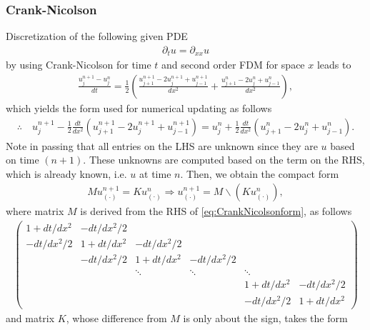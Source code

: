 \documentclass[12pt]{article}
\begin{document}
\subsubsection{Crank-Nicolson}
Discretization of the following given PDE
\begin{align}
	\partial_{t} u  = \partial_{xx} u
\end{align}
by using Crank-Nicolson for time $t$ and second order FDM for space $x$ leads to 
\begin{align}
	\frac{u^{n+1}_{j} - u^{n}_{j}}{dt}
	= \frac{1}{2}
	\left(
	\frac{u^{n+1}_{j+1}-2u^{n+1}_{j}+u^{n+1}_{j-1}}{dx^2}
	+ 
	\frac{u^{n}_{j+1}-2u^{n}_{j}+u^{n}_{j-1}}{dx^2}
	\right),
\end{align}
which yields the form used for numerical updating as follows
\begin{align}
	\label{eq:CrankNicolsonform}
	\therefore\quad\boxed{
		u^{n+1}_{j}
		- \frac{1}{2}\frac{dt}{dx^2} \left( u^{n+1}_{j+1}-2u^{n+1}_{j}+u^{n+1}_{j-1} \right)
		= u^{n}_{j}
		+ \frac{1}{2}\frac{dt}{dx^2} \left( u^{n}_{j+1}-2u^{n}_{j}+u^{n}_{j-1} \right).
	}
\end{align}
Note in passing that all entries on the LHS are unknown since they are $u$ based on time $(n+1)$. 
These unknowns are computed based on the term on the RHS, which is already known, i.e. $u$ at time $n$.
Then, we obtain the compact form
\begin{align}
	M u^{n+1}_{(\cdot)} = K u^{n}_{(\cdot)}
	\Rightarrow
	u^{n+1}_{(\cdot)} = M\backslash (Ku^{n}_{(\cdot)}) ,
\end{align}
where matrix $M$ is derived from the RHS of \eqref{eq:CrankNicolsonform}, as follows
\begin{align}
	\begin{pmatrix}
		1+dt/dx^2  & -dt/dx^2/2 &            &            &            &            \\
		-dt/dx^2/2 & 1+dt/dx^2  & -dt/dx^2/2 &            &            &            \\
		           & -dt/dx^2/2 & 1+dt/dx^2  & -dt/dx^2/2 &            &            \\
		           &            & \ddots     & \ddots     & \ddots     &            \\
		           &            &            &            & 1+dt/dx^2  & -dt/dx^2/2 \\
		           &            &            &            & -dt/dx^2/2 & 1+dt/dx^2
	\end{pmatrix}
\end{align}
and matrix $K$, whose difference from $M$ is only about the sign, takes the form
\end{document}
